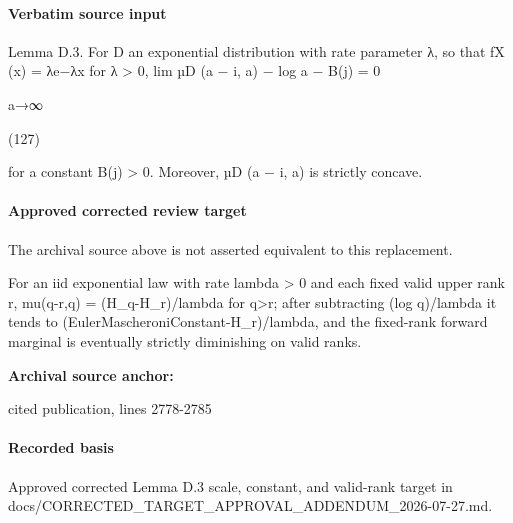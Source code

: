\documentclass[10pt]{article}
\begin{document}
\paragraph{Verbatim source input}
\begin{ReviewVerbatim}
Lemma D.3. For D an exponential distribution with rate parameter λ, so that fX (x) = λe−λx for λ > 0,
lim µD (a − i, a) − log a − B(j) = 0

a→∞

(127)

for a constant B(j) > 0. Moreover, µD (a − i, a) is strictly concave.
\end{ReviewVerbatim}

\paragraph{Approved corrected review target}
The archival source above is not asserted equivalent to this replacement.
\begin{ReviewVerbatim}
For an iid exponential law with rate lambda > 0 and each fixed valid upper rank r, mu(q-r,q) = (H_q-H_r)/lambda for q>r; after subtracting (log q)/lambda it tends to (EulerMascheroniConstant-H_r)/lambda, and the fixed-rank forward marginal is eventually strictly diminishing on valid ranks.
\end{ReviewVerbatim}

\textbf{Archival source anchor:} {\footnotesize\raggedright cited publication, lines 2778-\allowbreak{}2785\par}
\paragraph{Recorded basis}
Approved corrected Lemma D.\allowbreak{}3 scale, constant, and valid-\allowbreak{}rank target in docs/\allowbreak{}CORRECTED\_\allowbreak{}TARGET\_\allowbreak{}APPROVAL\_\allowbreak{}ADDENDUM\_\allowbreak{}2026-\allowbreak{}07-\allowbreak{}27.\allowbreak{}md.\allowbreak{}
\end{document}
